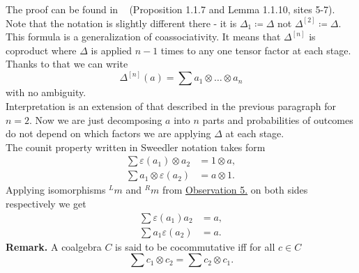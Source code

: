 \documentclass[a4paper, 12pt]{report}
\begin{document}
The proof can be found in ~\cite{DNR} (Proposition 1.1.7 and Lemma 1.1.10, sites 5-7). Note that the
notation is slightly different there - it is $\Delta_1 \coloneqq \Delta$ not $\Delta^{[2]} \coloneqq
 \Delta$. \\
This formula is a generalization of coassociativity. It means that $\Delta^{[n]}$ is coproduct where
$\Delta$ is applied $n-1$ times to any one tensor factor at each stage. Thanks to that we can write
\begin{equation*}
\Delta^{[n]}(a) = \sum a_1 \otimes \dots \otimes a_n
\end{equation*}
with no ambiguity. \\
Interpretation is an extension of that described in the previous paragraph for $n = 2$. Now we are just
decomposing $a$ into $n$ parts and probabilities of outcomes do not depend on which factors we are
applying $\Delta$ at each stage.  \\[8pt]
The counit property written in Sweedler notation takes form
\begin{align*}
\sum\varepsilon(a_1) \otimes a_2 &= 1 \otimes a, \\
\sum a_1 \otimes \varepsilon(a_2) &= a \otimes 1.
\end{align*}
Applying isomorphisms ${^Lm}$ and ${^Rm}$ from
\hyperref[observation:5]{Observation 5.} on both sides respectively we get
\begin{align*}
\sum\varepsilon(a_1)a_2 &= a, \\
\sum a_1\varepsilon(a_2) &= a.
\end{align*}
\textbf{Remark. } A coalgebra $C$ is said to be cocommutative iff for all $c \in C$
\begin{equation*}
\sum c_1 \otimes c_2 = \sum c_2 \otimes c_1.
\end{equation*}
\end{document}
